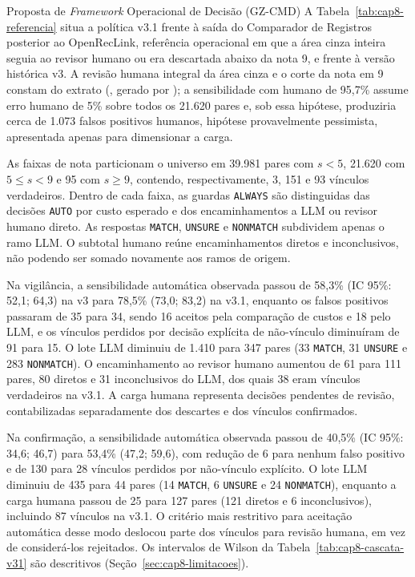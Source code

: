 \begin{chapter}{Proposta de \textit{Framework} Operacional de Decisão (GZ-CMD)}
A Tabela~\ref{tab:cap8-referencia} situa a política v3.1 frente à saída do Comparador de Registros posterior ao OpenRecLink, referência operacional em que a área cinza inteira seguia ao revisor humano ou era descartada abaixo da nota 9, e frente à versão histórica v3. A revisão humana integral da área cinza e o corte da nota em 9 constam do extrato (, gerado por ); a sensibilidade com humano de 95,7\% assume erro humano de 5\% sobre todos os 21.620 pares e, sob essa hipótese, produziria cerca de 1.073 falsos positivos humanos, hipótese provavelmente pessimista, apresentada apenas para dimensionar a carga.





As faixas de nota particionam o universo em 39.981 pares com $s<5$, 21.620 com $5\leq s<9$ e 95 com $s\geq9$, contendo, respectivamente, 3, 151 e 93 vínculos verdadeiros. Dentro de cada faixa, as guardas \texttt{ALWAYS} são distinguidas das decisões \texttt{AUTO} por custo esperado e dos encaminhamentos a LLM ou revisor humano direto. As respostas \texttt{MATCH}, \texttt{UNSURE} e \texttt{NONMATCH} subdividem apenas o ramo LLM. O subtotal humano reúne encaminhamentos diretos e inconclusivos, não podendo ser somado novamente aos ramos de origem.

Na vigilância, a sensibilidade automática observada passou de 58,3\% (IC 95\%: 52,1; 64,3) na v3 para 78,5\% (73,0; 83,2) na v3.1, enquanto os falsos positivos passaram de 35 para 34, sendo 16 aceitos pela comparação de custos e 18 pelo LLM, e os vínculos perdidos por decisão explícita de não-vínculo diminuíram de 91 para 15. O lote LLM diminuiu de 1.410 para 347 pares (33 \texttt{MATCH}, 31 \texttt{UNSURE} e 283 \texttt{NONMATCH}). O encaminhamento ao revisor humano aumentou de 61 para 111 pares, 80 diretos e 31 inconclusivos do LLM, dos quais 38 eram vínculos verdadeiros na v3.1. A carga humana representa decisões pendentes de revisão, contabilizadas separadamente dos descartes e dos vínculos confirmados.

Na confirmação, a sensibilidade automática observada passou de 40,5\% (IC 95\%: 34,6; 46,7) para 53,4\% (47,2; 59,6), com redução de 6 para nenhum falso positivo e de 130 para 28 vínculos perdidos por não-vínculo explícito. O lote LLM diminuiu de 435 para 44 pares (14 \texttt{MATCH}, 6 \texttt{UNSURE} e 24 \texttt{NONMATCH}), enquanto a carga humana passou de 25 para 127 pares (121 diretos e 6 inconclusivos), incluindo 87 vínculos na v3.1. O critério mais restritivo para aceitação automática desse modo deslocou parte dos vínculos para revisão humana, em vez de considerá-los rejeitados. Os intervalos de Wilson da Tabela~\ref{tab:cap8-cascata-v31} são descritivos (Seção~\ref{sec:cap8-limitacoes}).


\end{chapter}
